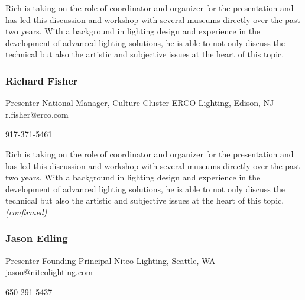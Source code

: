 \documentclass{report}
\begin{document}
              Rich is taking on the role of coordinator and organizer for the presentation and has led this discussion and workshop with several museums directly over the past two years. With a background in lighting design and experience in the development of advanced lighting solutions, he is able to not only discuss the technical but also the artistic and subjective issues at the heart of this topic.\newline


              

              
                \subsubsection*{ Richard Fisher }
                Presenter\newline
                National Manager, Culture Cluster\newline
                ERCO Lighting, Edison, NJ
                \newline
                r.fisher@erco.com\newline
                
                917-371-5461\newline

                Rich is taking on the role of coordinator and organizer for the presentation and has led this discussion and workshop with several museums directly over the past two years. With a background in lighting design and experience in the development of advanced lighting solutions, he is able to not only discuss the technical but also the artistic and subjective issues at the heart of this topic.
                \emph{ (confirmed) }
              

              
                \subsubsection*{ Jason Edling }
                Presenter\newline
                Founding Principal\newline
                Niteo Lighting, Seattle, WA
                \newline
                jason@niteolighting.com\newline
                
                650-291-5437\newline
\end{document}
